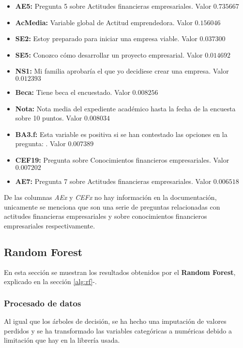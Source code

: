 \begin{itemize}
	\item \textbf{AE5:} Pregunta 5 sobre Actitudes financieras empresariales. Valor $0.735667$
	\item \textbf{AcMedia:} Variable global de Actitud emprendedora. Valor $0.156046$
	\item \textbf{SE2:} Estoy preparado para iniciar una empresa viable. Valor $0.037300$
	\item \textbf{SE5:} Conozco cómo desarrollar un proyecto empresarial. Valor $0.014692$
	\item \textbf{NS1:} Mi familia aprobaría el que yo decidiese crear una empresa. Valor $0.012393$
	\item \textbf{Beca:} Tiene beca el encuestado. Valor $0.008256$
	\item \textbf{Nota:} Nota media del expediente académico hasta la fecha de la encuesta sobre 10 puntos. Valor $0.008034$
	\item \textbf{BA3.f:} Esta variable es positiva si se han contestado las opciones  en la pregunta: . Valor $0.007389$
	\item \textbf{CEF19:} Pregunta sobre Conocimientos financieros empresariales. Valor $0.007202$
	\item \textbf{AE7:} Pregunta 7 sobre Actitudes financieras empresariales. Valor $0.006518$
\end{itemize}
De las columnas \textit{AEx} y \textit{CEFx} no hay información en la documentación, unicamente se menciona que son una serie de preguntas relacionadas con actitudes financieras empresariales y sobre conocimientos financieros empresariales respectivamente.
\pagebreak
\subsection{Random Forest}
En esta sección se muestran los resultados obtenidos por el \textbf{Random Forest}, explicado en la sección \ref{alg:rf}-.
\subsubsection*{Procesado de datos}
Al igual que los árboles de decisión, se ha hecho una imputación de valores perdidos y se ha transformado las variables categóricas a numéricas debido a limitación que hay en la librería usada.
